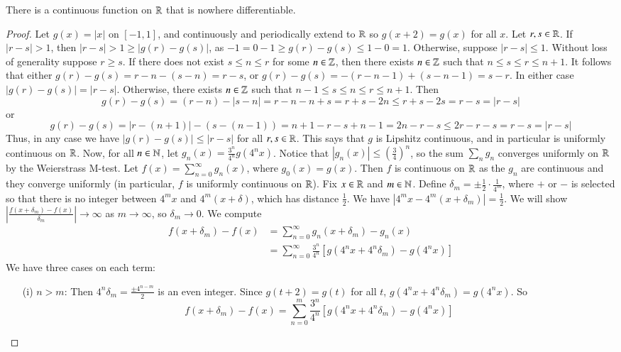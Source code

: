 \begin{theorem}
    There is a continuous function on $\mathbb R$ that is nowhere differentiable.
\end{theorem}
\begin{proof}
    Let $g(x) = |x|$ on $[-1,1]$, and continuously and periodically extend to $\mathbb R$ so $g(x+2) =g(x)$ for all $x$. Let $r,s \in \mathbb R$. If $|r-s| > 1$, then $|r-s| > 1 \geq |g(r) - g(s)|$, as $-1 = 0-1\geq g(r)-g(s) \leq 1 - 0 = 1$. Otherwise, suppose $|r-s| \leq 1$. Without loss of generality suppose $r \geq s$. If there does not exist $s \leq n \leq r$ for some $n \in \mathbb Z$, then there exists $n \in \mathbb Z$ such that $n \leq s \leq r \leq n+1$. It follows that either $g(r) - g(s) = r-n-(s-n) = r-s$, or $g(r) - g(s) = -(r-n-1)+(s-n-1) = s-r$. In either case $|g(r) - g(s)| = |r-s|$. Otherwise, there exists $n \in \mathbb Z$ such that $n-1 \leq s \leq n \leq r \leq n+1$. Then $$g(r) - g(s) = (r-n)-|s-n| = r-n-n+s=r+s-2n\leq r+s-2s = r-s = |r-s|$$ or $$g(r)-g(s) = |r-(n+1)| -(s-(n-1)) = n+1-r-s+n-1 = 2n-r-s \leq 2r-r-s = r-s = |r-s|$$ Thus, in any case we have $|g(r) - g(s)| \leq |r-s|$ for all $r,s \in \mathbb R$. This says that $g$ is Lipshitz continuous, and in particular is uniformly continuous on $\mathbb R$. Now, for all $n \in \mathbb N$, let $g_n(x) = \frac{3^n}{4^n}g(4^nx)$. Notice that $|g_n(x)| \leq \left(\frac{3}{4}\right)^n$, so the sum $\sum_n g_n$ converges uniformly on $\mathbb R$ by the Weierstrass M-test. Let $f(x) = \sum_{n=0}^{\infty}g_n(x)$, where $g_0(x) = g(x)$. Then $f$ is continuous on $\mathbb R$ as the $g_n$ are continuous and they converge uniformly (in particular, $f$ is uniformly continuous on $\mathbb R$). Fix $x \in \mathbb R$ and $m \in \mathbb N$. Define $\delta_m = \pm\frac{1}{2}\cdot\frac{1}{4^m}$, where $+$ or $-$ is selected so that there is no integer between $4^mx$ and $4^m(x+\delta)$, which has distance $\frac{1}{2}$. We have $|4^mx - 4^m(x+\delta_m)| = \frac{1}{2}$. We will show $\left|\frac{f(x+\delta_m) - f(x)}{\delta_m}\right|\rightarrow \infty$ as $m\rightarrow \infty$, so $\delta_m\rightarrow 0$. We compute \begin{align*}
        f(x+\delta_m) - f(x) &= \sum_{n=0}^{\infty}g_n(x+\delta_m) - g_n(x) \\
        &= \sum_{n=0}^{\infty}\frac{3^n}{4^n}\left[g(4^nx+4^n\delta_m) - g(4^nx)\right] 
    \end{align*}
    We have three cases on each term: \begin{itemize}
        \item[(i)] $n > m$: Then $4^n\delta_m = \frac{\pm 4^{n-m}}{2}$ is an even integer. Since $g(t+2)=g(t)$ for all $t$, $g(4^nx+4^n\delta_m) = g(4^nx)$. So $$f(x+\delta_m) - f(x) = \sum_{n=0}^m\frac{3^n}{4^n}[g(4^nx+4^n\delta_m) - g(4^nx)]$$

\end{itemize}
\end{proof}
